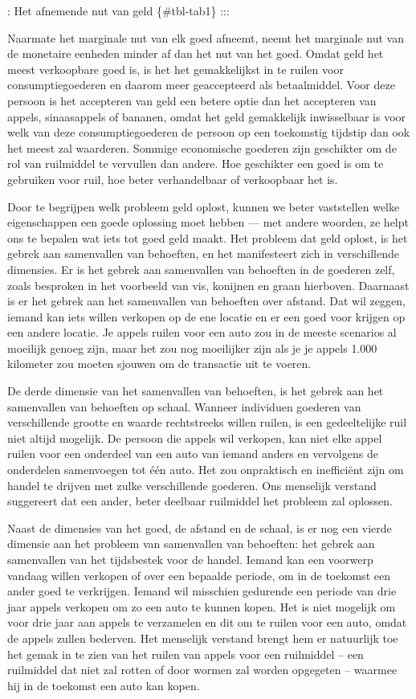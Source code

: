 \documentclass[
  a5paper,
  smalldemyvopaper,11pt,twoside,onecolumn,openright,extrafontsizes,
hidelinks]{memoir}
\begin{document}
: Het afnemende nut van geld \{\#tbl-tab1\} :::

Naarmate het marginale nut van elk goed afneemt, neemt het marginale nut
van de monetaire eenheden minder af dan het nut van het goed. Omdat geld
het meest verkoopbare goed is, is het het gemakkelijkst in te ruilen
voor consumptiegoederen en daarom meer geaccepteerd als betaalmiddel.
Voor deze persoon is het accepteren van geld een betere optie dan het
accepteren van appels, sinaasappels of bananen, omdat het geld
gemakkelijk inwisselbaar is voor welk van deze consumptiegoederen de
persoon op een toekomstig tijdstip dan ook het meest zal waarderen.
Sommige economische goederen zijn geschikter om de rol van ruilmiddel te
vervullen dan andere. Hoe geschikter een goed is om te gebruiken voor
ruil, hoe beter verhandelbaar of verkoopbaar het is.

Door te begrijpen welk probleem geld oplost, kunnen we beter vaststellen
welke eigenschappen een goede oplossing moet hebben --- met andere
woorden, ze helpt ons te bepalen wat iets tot goed geld maakt. Het
probleem dat geld oplost, is het gebrek aan samenvallen van behoeften,
en het manifesteert zich in verschillende dimensies. Er is het gebrek
aan samenvallen van behoeften in de goederen zelf, zoals besproken in
het voorbeeld van vis, konijnen en graan hierboven. Daarnaast is er het
gebrek aan het samenvallen van behoeften over afstand. Dat wil zeggen,
iemand kan iets willen verkopen op de ene locatie en er een goed voor
krijgen op een andere locatie. Je appels ruilen voor een auto zou in de
meeste scenarios al moeilijk genoeg zijn, maar het zou nog moeilijker
zijn als je je appels 1.000 kilometer zou moeten sjouwen om de
transactie uit te voeren.

De derde dimensie van het samenvallen van behoeften, is het gebrek aan
het samenvallen van behoeften op schaal. Wanneer individuen goederen van
verschillende grootte en waarde rechtstreeks willen ruilen, is een
gedeeltelijke ruil niet altijd mogelijk. De persoon die appels wil
verkopen, kan niet elke appel ruilen voor een onderdeel van een auto van
iemand anders en vervolgens de onderdelen samenvoegen tot één auto. Het
zou onpraktisch en inefficiënt zijn om handel te drijven met zulke
verschillende goederen. Ons menselijk verstand suggereert dat een ander,
beter deelbaar ruilmiddel het probleem zal oplossen.

Naast de dimensies van het goed, de afstand en de schaal, is er nog een
vierde dimensie aan het probleem van samenvallen van behoeften: het
gebrek aan samenvallen van het tijdsbestek voor de handel. Iemand kan
een voorwerp vandaag willen verkopen of over een bepaalde periode, om in
de toekomst een ander goed te verkrijgen. Iemand wil misschien gedurende
een periode van drie jaar appels verkopen om zo een auto te kunnen
kopen. Het is niet mogelijk om voor drie jaar aan appels te verzamelen
en dit om te ruilen voor een auto, omdat de appels zullen bederven. Het
menselijk verstand brengt hem er natuurlijk toe het gemak in te zien van
het ruilen van appels voor een ruilmiddel -- een ruilmiddel dat niet zal
rotten of door wormen zal worden opgegeten -- waarmee hij in de toekomst
een auto kan kopen.
\end{document}
